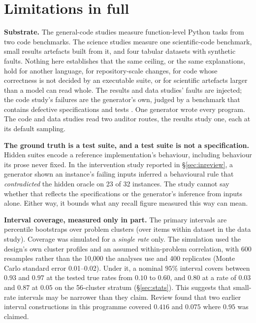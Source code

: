 \section{Limitations in full}
\label{sec:limitations-full}
\textbf{Substrate.} The general-code studies measure function-level Python tasks from two code
benchmarks. The science studies measure one scientific-code benchmark, small results artefacts
built from it, and four tabular datasets with synthetic faults. Nothing here establishes that the same ceiling, or the same
explanations, hold for another language, for repository-scale changes, for code whose correctness is
not decided by an executable suite, or for scientific artefacts larger than a model can read whole.
The results and data studies' faults are injected; the code study's failures are the generator's
own, judged by a benchmark that contains defective specifications and tests
\citep{hu2026scicodeverified}. One generator wrote every program. The code and data studies read two
auditor routes, the results study one, each at its default sampling.

\textbf{The ground truth is a test suite, and a test suite is not a specification.} Hidden
suites encode a reference implementation's behaviour, including behaviour its prose never fixed.
In the intervention study reported in \S\ref{sec:inreview}, a generator shown an instance's
failing inputs inferred a behavioural rule that \emph{contradicted} the hidden oracle on 23 of
32 instances. The study cannot say whether that reflects the specifications or the generator's
inference from inputs alone. Either way, it bounds what any recall figure measured this way can
mean.

\textbf{Interval coverage, measured only in part.} The primary intervals are percentile
bootstraps over problem clusters (over items within dataset in the data study). Coverage was
simulated for a \emph{single rate} only. The simulation used the design's own cluster profiles and
an assumed within-problem correlation, with 600 resamples rather than the 10{,}000 the analyses use
and 400 replicates (Monte Carlo standard error 0.01--0.02). Under it, a nominal $95\%$ interval
covers between $0.93$ and $0.97$ at the tested true rates from $0.10$ to $0.60$, and $0.80$ at a rate of $0.03$ and $0.87$ at $0.05$ on the 56-cluster stratum (\S\ref{sec:stats}). This suggests that small-rate
intervals may be narrower than they claim. Review found that two earlier interval constructions in
this programme covered $0.416$ and $0.075$ where $0.95$ was claimed.


